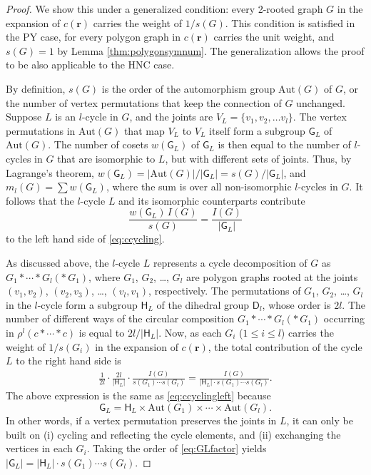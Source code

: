 \documentclass[preprint]{revtex4-1}
\newcommand{\vct}[1]{\mathbf{#1}}
\providecommand{\vr}{} %
\renewcommand{\vr}{\vct{r}}
\newcommand{\G}{\mathsf{G}}
\newcommand{\D}{\mathsf{D}}
\newcommand{\Hgroup}{\mathsf{H}}
\newcommand{\Aut}{\mathrm{Aut}}
\begin{document}
\begin{proof}
We show this under a generalized condition:
every 2-rooted graph $G$ in the expansion of $c(\vr)$
carries the weight of $1/s(G)$.
%
This condition is satisfied in the PY case,
for every polygon graph in $c(\vr)$
carries the unit weight,
and $s(G) = 1$ by Lemma \ref{thm:polygonsymnum}.
%
The generalization
allows the proof to be also applicable to the HNC case. %


By definition,
$s(G)$ is the order of the automorphism group $\Aut(G)$ of $G$,
or the number of vertex permutations that keep the connection of $G$ unchanged.
%
Suppose $L$ is an $l$-cycle in $G$,
and the joints are $V_L = \{v_1, v_2, \dots v_l\}$.
%
The vertex permutations in $\Aut(G)$ that
map $V_L$ to $V_L$ itself %
form a subgroup $\G_L$ of $\Aut(G)$.
%
The number of cosets $w(\G_L)$ of $\G_L$
is then equal to the number of $l$-cycles in $G$
that are isomorphic to $L$,
but with different sets of joints.
%
Thus, by Lagrange's theorem,
$w(\G_L) = |\Aut(G)|/|\G_L| = s(G)/|\G_L|$,
%
and
$m_l(G) = \sum w(\G_L)$,
where the sum is over all non-isomorphic $l$-cycles in $G$.
%
It follows that the $l$-cycle $L$
and its isomorphic counterparts
contribute
\begin{equation}
  \frac{ w(\G_L) \, I(G) }{ s(G) }
= \frac{ I(G) }{ |\G_L|}
\label{eq:ccyclingleft}
\end{equation}
to the left hand side of \eqref{eq:ccycling}.


As discussed above,
the $l$-cycle $L$ represents a cycle decomposition of $G$
as $G_1 * \cdots * G_l (* \, G_1)$,
where $G_1$, $G_2$, \dots, $G_l$ are polygon graphs
rooted at the joints
$(v_1, v_2)$, $(v_2, v_3)$, \dots, $(v_l, v_1)$, respectively.
%
The permutations of $G_1$, $G_2$, \dots, $G_l$ in the $l$-cycle
form a subgroup $\Hgroup_L$ of the dihedral group $\D_l$,
whose order is $2l$.
%
The number of different ways of the circular composition
$G_1 * \cdots * G_l (*\, G_1)$
occurring in $\rho^l (c * \cdots * c)$ is equal to $2l / |\Hgroup_L|$.
%
Now, as each $G_i$ ($1 \le i \le l$)
carries the weight of $1/s(G_i)$ in the expansion of $c(\vr)$,
the total contribution of the cycle $L$
to the right hand side is
\begin{align*}
  \frac{1}{2l}
  \cdot
  \frac{2l}{|\Hgroup_L|}
  \cdot
  \frac{I(G)}{ s(G_1) \cdots s(G_l)}
= \frac{ I(G) }
 { |\Hgroup_L| \cdot s(G_1) \cdots s(G_l) }.
\end{align*}
The above expression is the same as \eqref{eq:ccyclingleft}
because
\begin{equation}
  \G_L = \Hgroup_L \times \Aut(G_1) \times \cdots \times \Aut(G_l).
  \label{eq:GLfactor}
\end{equation}
%
In other words,
if a vertex permutation preserves the joints in $L$,
it can only be built on
(i) cycling and reflecting the cycle elements, and
(ii) exchanging the vertices in each $G_i$.
Taking the order of \eqref{eq:GLfactor} yields
$|\G_L| = |\Hgroup_L| \cdot s(G_1) \cdots s(G_l)$.
\end{proof}
\end{document}
